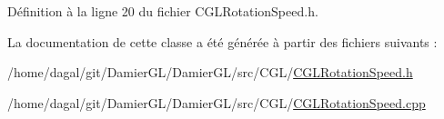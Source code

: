 Définition à la ligne 20 du fichier C\-G\-L\-Rotation\-Speed.\-h.



La documentation de cette classe a été générée à partir des fichiers suivants \-:\begin{DoxyCompactItemize}
\item 
/home/dagal/git/\-Damier\-G\-L/\-Damier\-G\-L/src/\-C\-G\-L/\hyperlink{_c_g_l_rotation_speed_8h}{C\-G\-L\-Rotation\-Speed.\-h}\item 
/home/dagal/git/\-Damier\-G\-L/\-Damier\-G\-L/src/\-C\-G\-L/\hyperlink{_c_g_l_rotation_speed_8cpp}{C\-G\-L\-Rotation\-Speed.\-cpp}\end{DoxyCompactItemize}
